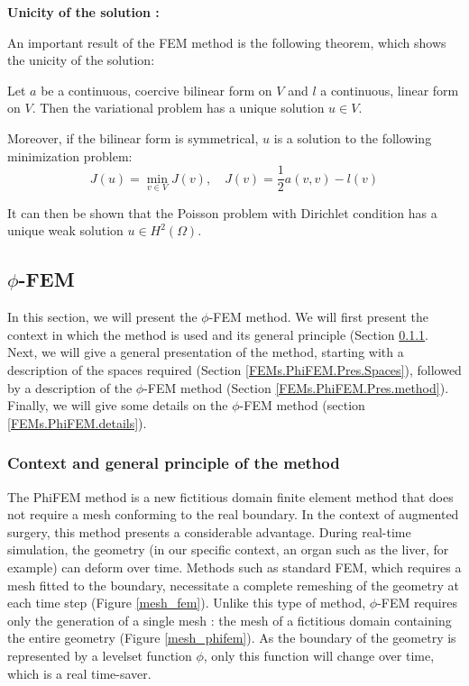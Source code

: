 \textbf{Unicity of the solution :}

An important result of the FEM method is the following theorem, which shows the unicity of the solution:

\begin{Prop}
	
	Let $a$ be a continuous, coercive bilinear form on $V$ and $l$ a continuous, linear form on $V$. Then the variational problem has a unique solution $u\in V$. 
	
	Moreover, if the bilinear form is symmetrical, $u$ is a solution to the following minimization problem:
	\begin{equation*}
		J(u)=\min_{v\in V} J(v), \quad J(v)=\frac{1}{2}a(v,v)-l(v)
	\end{equation*}
\end{Prop}

It can then be shown that the Poisson problem with Dirichlet condition has a unique weak solution $u\in H^2(\Omega)$.

\subsection{$\phi$-FEM} \label{FEMs.PhiFEM}

In this section, we will present the $\phi$-FEM method. We will first present the context in which the method is used and its general principle (Section \ref{FEMs.PhiFEM.pinciple}. Next, we will give a general presentation of the method, starting with a description of the spaces required (Section \ref{FEMs.PhiFEM.Pres.Spaces}), followed by a description of the $\phi$-FEM method (Section \ref{FEMs.PhiFEM.Pres.method}). Finally, we will give some details on the $\phi$-FEM method (section \ref{FEMs.PhiFEM.details}).

\subsubsection{Context and general principle of the method} \label{FEMs.PhiFEM.pinciple}

The PhiFEM method is a new fictitious domain finite element method that does not require a mesh conforming to the real boundary. In the context of augmented surgery, this method presents a considerable advantage. During real-time simulation, the geometry (in our specific context, an organ such as the liver, for example) can deform over time. Methods such as standard FEM, which requires a mesh fitted to the boundary, necessitate a complete remeshing of the geometry at each time step (Figure \ref{mesh_fem}). Unlike this type of method, $\phi$-FEM requires only the generation of a single mesh : the mesh of a fictitious domain containing the entire geometry (Figure \ref{mesh_phifem}). As the boundary of the geometry is represented by a levelset function $\phi$, only this function will change over time, which is a real time-saver.

